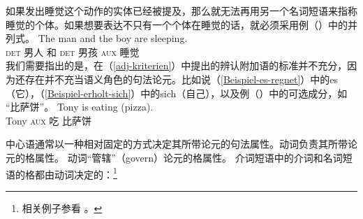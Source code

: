 \z
如果发出睡觉这个动作的实体已经被提及，那么就无法再用另一个名词短语来指称睡觉的个体。如果想要表达不只有一个个体在睡觉的话，就必须采用例（）中的并列式。
\ea
\gll The man and the boy are sleeping.\\
      \textsc{det} 男人 和 \textsc{det} 男孩  \textsc{aux} 睡觉\\
\z
我们需要指出的是，在（\ref{adj-kriterien}）中提出的辨认附加语的标准并不充分，因为还存在并不充当语义角色的句法论元。比如说（\ref{Beispiel-es-regnet}）中的es（它），（\ref{Beispiel-erholt-sich}）中的sich（自己），以及例（）中的可选成分，如 “比萨饼”。
\ea
\gll Tony is           eating (pizza). \\
     Tony \textsc{aux} 吃     比萨饼\\
\z

\noindent
中心语通常以一种相对固定的方式决定其所带论元的句法属性。动词负责其所带论元的格属性。
\eal
{}
\zl
动词“管辖”（govern）论元的格属性。
 介词短语中的介词和名词短语的格都由动词决定的：\footnote{%
相关例子参看  。
}

